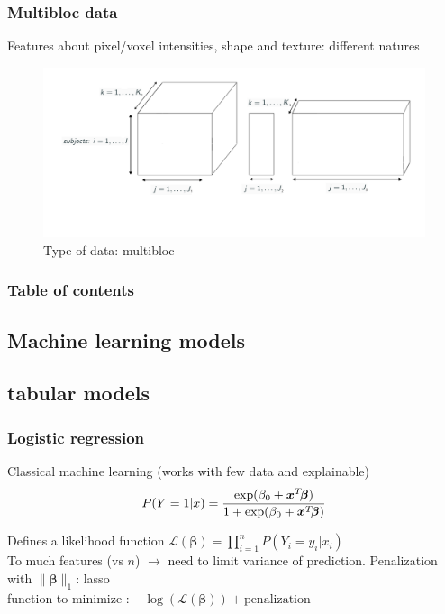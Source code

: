 \documentclass{beamer}
\begin{document}
\begin{frame}
    \frametitle{Multibloc data}
    Features about pixel/voxel intensities, shape and texture: different natures
    \begin{figure}
        \centering
        \includegraphics[scale = 0.25]{images/blocks.png}
        \caption{Type of data: multibloc}
    \end{figure}
\end{frame}



\begin{frame}
    \frametitle{Table of contents}
    \tableofcontents
\end{frame}

\begin{frame}
    \section{Machine learning models}
    \subsection{tabular models}
\end{frame}

\begin{frame}
    \frametitle{Logistic regression}
    Classical machine learning (works with few data and explainable)\\[10 pt]

    $$P(Y = 1|x) = \frac{\exp(\beta_0 + \bm{x}^T\hspace{-2 pt}\bm{\beta})}{1 + \exp(\beta_0 + \bm{x}^T\hspace{-2 pt}\bm{\beta})}$$

    Defines a likelihood function $\mathcal{L}(\bm{\beta}) = \prod_{i = 1}^n P(Y_i = y_i|x_i)$\\[15 pt]

    To much features (vs $n$) $\rightarrow$ need to limit variance of prediction. Penalization with $\lVert \bm{\beta} \rVert_1$: lasso\\[15 pt]

    function to minimize : $- \log(\mathcal{L}(\bm{\beta})) + \text{penalization}$ 
\end{frame}
\end{document}
